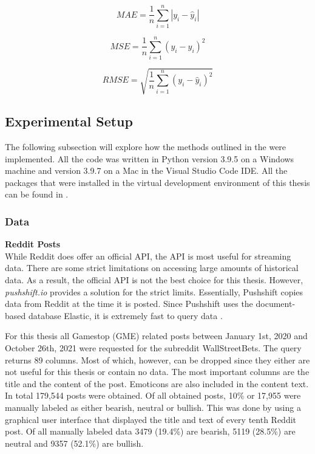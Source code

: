 \documentclass[11pt, a4paper]{article}
\begin{document}
\begin{equation*}
    MAE = \frac{1}{n}\sum_{i=1}^{n}|y_{i}-\hat{y}_{i}|
\end{equation*}

\begin{equation*}
    MSE = \frac{1}{n}\sum_{i=1}^{n}(y_{i}-\hat{y}_{i})^2
\end{equation*}

\begin{equation*}
    RMSE = \sqrt{\frac{1}{n}\sum_{i=1}^{n}(y_{i}-\hat{y}_{i})^2}
\end{equation*}


\subsection{Experimental Setup}
The following subsection will explore how the methods outlined in the  were implemented.
All the code was written in Python version 3.9.5 on a Windows machine and version 3.9.7 on a Mac in the Visual Studio Code IDE. All the packages that were installed in the 
virtual development environment of this thesis can be found in .

\subsubsection{Data}

\noindent\textbf{Reddit Posts}\\
While Reddit does offer an official API, the API is most useful for streaming data. 
There are some strict limitations on accessing large amounts of historical data. As a result, the official API is not the best choice for this thesis. 
However, \emph{pushshift.io} provides a solution for the strict limits. Essentially, Pushshift copies data from Reddit at the time it is posted. Since Pushshift uses the document-based database Elastic, it is extremely fast to query data \citep{elastic2015}.

For this thesis all Gamestop (GME) related posts between January 1st, 2020 and October 26th, 2021 were requested for the subreddit WallStreetBets. 
The query returns 89 columns. Most of which, however, can be dropped since they either are not useful for this thesis or contain no data. 
The most important columns are the title and the content of the post. 
Emoticons are also included in the content text. In total 179,544 posts were obtained. Of all obtained posts, 10\% or 17,955 were manually labeled as either bearish, neutral or bullish. This was done by using a graphical user interface that displayed the title and
text of every tenth Reddit post. Of all manually labeled data 3479 (19.4\%) are bearish, 5119 (28.5\%) are neutral and 9357 (52.1\%) are bullish. \\
\end{document}
